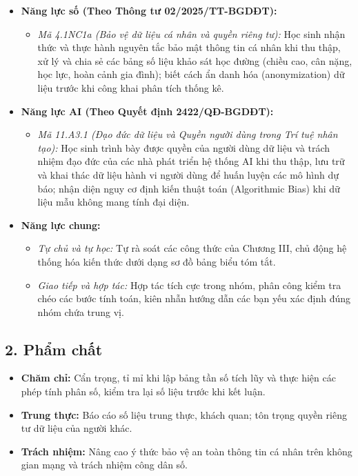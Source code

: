 \documentclass[12pt, a4paper]{article}
\begin{document}
\begin{itemize}[leftmargin=1.2cm]
    \item \textbf{Năng lực số (Theo Thông tư 02/2025/TT-BGDĐT):}
    \begin{itemize}[leftmargin=0.6cm]
        \item \textit{Mã 4.1NC1a (Bảo vệ dữ liệu cá nhân và quyền riêng tư):} Học sinh nhận thức và thực hành nguyên tắc bảo mật thông tin cá nhân khi thu thập, xử lý và chia sẻ các bảng số liệu khảo sát học đường (chiều cao, cân nặng, học lực, hoàn cảnh gia đình); biết cách ẩn danh hóa (anonymization) dữ liệu trước khi công khai phân tích thống kê.
    \end{itemize}

    \item \textbf{Năng lực AI (Theo Quyết định 2422/QĐ-BGDĐT):}
    \begin{itemize}[leftmargin=0.6cm]
        \item \textit{Mã 11.A3.1 (Đạo đức dữ liệu và Quyền người dùng trong Trí tuệ nhân tạo):} Học sinh trình bày được quyền của người dùng dữ liệu và trách nhiệm đạo đức của các nhà phát triển hệ thống AI khi thu thập, lưu trữ và khai thác dữ liệu hành vi người dùng để huấn luyện các mô hình dự báo; nhận diện nguy cơ định kiến thuật toán (Algorithmic Bias) khi dữ liệu mẫu không mang tính đại diện.
    \end{itemize}

    \item \textbf{Năng lực chung:}
    \begin{itemize}[leftmargin=0.6cm]
        \item \textit{Tự chủ và tự học:} Tự rà soát các công thức của Chương III, chủ động hệ thống hóa kiến thức dưới dạng sơ đồ bảng biểu tóm tắt.
        \item \textit{Giao tiếp và hợp tác:} Hợp tác tích cực trong nhóm, phân công kiểm tra chéo các bước tính toán, kiên nhẫn hướng dẫn các bạn yếu xác định đúng nhóm chứa trung vị.
    \end{itemize}
\end{itemize}

\subsection*{2. Phẩm chất}

\begin{itemize}[leftmargin=1.2cm]
    \item \textbf{Chăm chỉ:} Cẩn trọng, tỉ mỉ khi lập bảng tần số tích lũy và thực hiện các phép tính phân số, kiểm tra lại số liệu trước khi kết luận.
    \item \textbf{Trung thực:} Báo cáo số liệu trung thực, khách quan; tôn trọng quyền riêng tư dữ liệu của người khác.
    \item \textbf{Trách nhiệm:} Nâng cao ý thức bảo vệ an toàn thông tin cá nhân trên không gian mạng và trách nhiệm công dân số.
\end{itemize}
\end{document}
